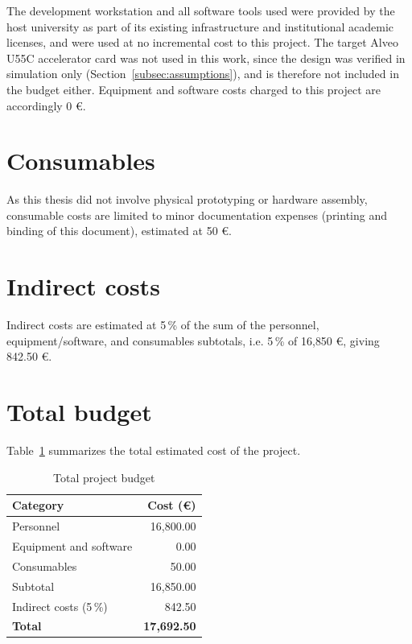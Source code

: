 The development workstation and all software tools used were provided by the host university as part of its existing
infrastructure and institutional academic licenses, and were used at no incremental cost to
this project. The target Alveo U55C accelerator card was not used in this work, since the
design was verified in simulation only (Section~\ref{subsec:assumptions}), and is therefore not
included in the budget either. Equipment and software costs charged to this project are
accordingly 0 \euro.

\section{Consumables}

As this thesis did not involve physical prototyping or hardware assembly, consumable costs are 
limited to minor documentation expenses (printing and binding of this document), estimated at 
50 \euro.

\section{Indirect costs}

Indirect costs are estimated at 5\,\% of the sum of the personnel, equipment/software, and
consumables subtotals, i.e. 5\,\% of  16{,}850 \euro, giving  842.50 \euro.

\section{Total budget}

Table~\ref{tab:budget-total} summarizes the total estimated cost of the project.

\begin{table}[h]
  \centering
  \begin{tabular}{lr}
    \hline
    Category & Cost (\euro) \\
    \hline
    Personnel & 16{,}800.00 \\
    Equipment and software & 0.00 \\
    Consumables & 50.00 \\
    \hline
    Subtotal & 16{,}850.00 \\
    Indirect costs (5\,\%) & 842.50 \\
    \hline
    \textbf{Total} & \textbf{17{,}692.50} \\
    \hline
  \end{tabular}
  \caption{Total project budget}
  \label{tab:budget-total}
\end{table}
